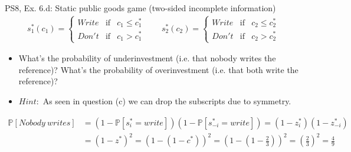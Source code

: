 \begin{frame}{PS8, Ex. 6.d: Static public goods game (two-sided incomplete information)}
    \begin{align*}
      s_1^*(c_1)=\left\{\begin{array}{rcl}
        Write & \text{if} & c_1\leq c_1^*\\
        Don't & \text{if} & c_1>c_1^*
        \end{array}\right.\quad\quad
      s_2^*(c_2)=\left\{\begin{array}{rcl}
        Write & \text{if} & c_2\leq c_2^*\\
        Don't & \text{if} & c_2>c_2^*
        \end{array}\right.
    \end{align*}
    \vspace{-12pt}
    \begin{itemize}
      \item[(d)] What’s the probability of underinvestment (i.e. that nobody writes the reference)? What’s the probability of overinvestment (i.e. that both write the reference)?
      \item[]    $Hint:$ As seen in question (c) we can drop the subscripts due to symmetry.
    \end{itemize}
    \vspace{-8pt}
    \begin{align*}
      \mathbb{P}[Nobody\ writes]&=(1-\mathbb{P}[s_{i}^*=write])(1-\mathbb{P}[s_{-i}^*=write])=(1-z_{i}^*)(1-z_{-i}^*)\\
                                &=(1-z^*)^2=(1-(1-c^*))^2=\left(1-\left(1-\frac{2}{3}\right)\right)^2=\left(\frac{2}{3}\right)^2=\frac{4}{9}
    \end{align*}
    \vfill\null
\end{frame}
